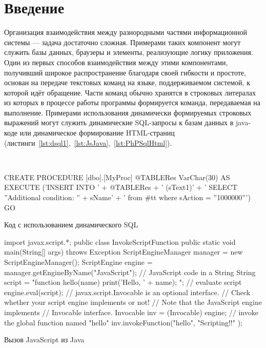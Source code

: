 \section*{Введение}
Организация взаимодействия между разнородными частями информационной системы --- задача достаточно сложная. Примерами таких компонент могут служить базы данных, браузеры и элементы, реализующие логику приложения. 
Один из первых способов взаимодействия между этими компонентами, получивший широкое распространение благодаря своей гибкости и простоте, основан на передаче текстовых команд на языке, поддерживаемом системой, 
к которой идёт обращение. Части команд обычно хранятся в строковых литералах из которых в процессе работы программы формируется команда, передаваемая на выполнение. Примерами использования динамически 
формируемых строковых выражений могут служить динамические SQL-запросы к базам данных в java-коде или динамическое формирование HTML-страниц (листинги~\ref{lst:dsql1},~\ref{lst:JsJava},~\ref{lst:PhPSqlHtml}).   

\

\begin{listing}
    \begin{pyglist}[language=sql,numbers=left,numbersep=5pt]

CREATE PROCEDURE [dbo].[MyProc]  @TABLERes   VarChar(30)
AS
    EXECUTE ('INSERT INTO ' + @TABLERes + ' (sText1)' +
             ' SELECT ''Additional condition: '' + sName' +
             ' from #tt where sAction = ''1000000''')
GO
    \end{pyglist}
\caption{Код с использованием динамического SQL}
\label{lst:dsql1}
\end{listing} 
 
\begin{listing}
    \begin{pyglist}[language=java,numbers=left,numbersep=5pt]
import javax.script.*;  
public class InvokeScriptFunction {  
    public static void main(String[] args) throws Exception {  
        ScriptEngineManager manager = new ScriptEngineManager();  
        ScriptEngine engine = manager.getEngineByName("JavaScript");  
        // JavaScript code in a String  
        String script = 
            "function hello(name) { print('Hello, ' + name); }";  
        // evaluate script  
        engine.eval(script);  
        // javax.script.Invocable is an optional interface.  
        // Check whether your script engine implements or not!  
        // Note that the JavaScript engine implements
        // Invocable interface.  
        Invocable inv = (Invocable) engine;  
        // invoke the global function named "hello"  
        inv.invokeFunction("hello", "Scripting!!" );  
    }  
}
    \end{pyglist}
\caption{Вызов JavaScript из Java}
\label{lst:JsJava}
\end{listing}


